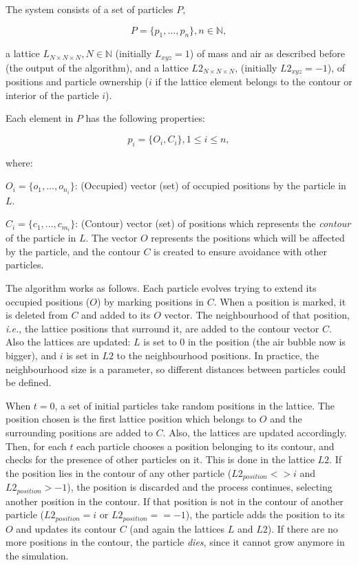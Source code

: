 \documentclass[oneside,a4paper,english,links]{amca}
\begin{document}
The system consists of a set of particles $P$, 

\begin{equation}
  P = \{p_{1}, ... , p_{n}\}, n  \in \mathbb{N},
\end{equation}

a lattice $L_{N\times N \times N}, N \in \mathbb{N} $ (initially $L_{xyz}=1$) of mass and air as described before (the output of the algorithm), and a lattice $L2_{N\times N \times N}$, (initially $L2_{xyz}=-1$), of positions and particle ownership ($i$ if the lattice element belongs to the contour or interior of the particle $i$).

Each element in $P$ has the following properties:

\begin{equation}
  p_{i} = \{O_{i}, C_{i}\}, 1 \le i \le n,
\end{equation}

where:

$O_{i} = \{o_{1}, ... , o_{n_{i}}\}$: (Occupied) vector (set) of occupied positions by the particle in $L$.

$C_{i} = \{c_{1}, ... , c_{m_{i}}\}$: (Contour) vector (set) of positions which represents the {\em contour} of the particle in $L$. The vector $O$ represents the positions which will be affected by the particle, and the contour $C$ is created to ensure avoidance with other particles.

The algorithm works as follows. Each particle evolves trying to extend its occupied positions ($O$) by marking positions in $C$. When a position is marked, it is deleted from $C$ and added to its $O$ vector. The neighbourhood of that position, {\em i.e.}, the lattice positions that surround it, are added to the contour vector $C$. Also the lattices are updated: $L$ is set to $0$ in the position (the air bubble now is bigger), and $i$ is set in $L2$ to the neighbourhood positions. In practice, the neighbourhood size is a parameter, so different distances between particles could be defined.

When $t = 0$, a set of initial particles take random positions in the lattice. The position chosen is the first lattice position which belongs to $O$ and the surrounding positions are added to $C$. Also, the lattices are updated accordingly. Then, for each $t$ each particle chooses a position belonging to its contour, and checks for the presence of other particles on it. This is done in the lattice $L2$. If the position lies in the contour of any other particle ($L2_{position} <> i$ and $L2_{position} > -1$), the position is discarded and the process continues, selecting another position in the contour. If that position is not in the contour of another particle ($L2_{position} = i$ or $L2_{position} == -1$), the particle adds the position to its $O$ and updates its contour $C$ (and again the lattices $L$ and $L2$). If there are no more positions in the contour, the particle {\em dies}, since it cannot grow anymore in the simulation.
\end{document}
